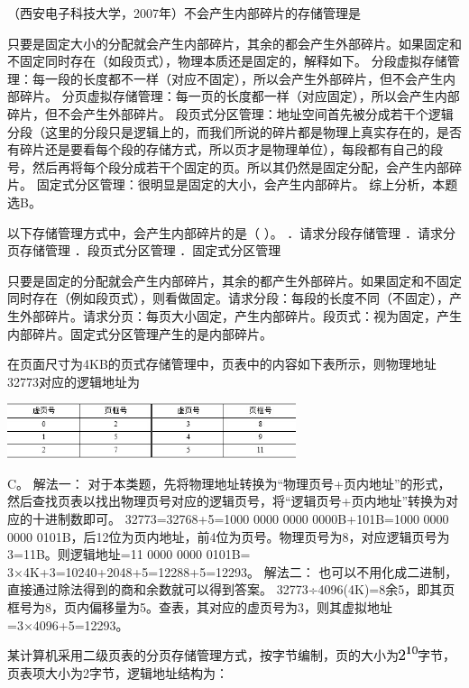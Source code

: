 \question （西安电子科技大学，2007年）不会产生内部碎片的存储管理是
\par{}
\begin{solution}只要是固定大小的分配就会产生内部碎片，其余的都会产生外部碎片。如果固定和不固定同时存在（如段页式），物理本质还是固定的，解释如下。
分段虚拟存储管理：每一段的长度都不一样（对应不固定），所以会产生外部碎片，但不会产生内部碎片。
分页虚拟存储管理：每一页的长度都一样（对应固定），所以会产生内部碎片，但不会产生外部碎片。
段页式分区管理：地址空间首先被分成若干个逻辑分段（这里的分段只是逻辑上的，而我们所说的碎片都是物理上真实存在的，是否有碎片还是要看每个段的存储方式，所以页才是物理单位），每段都有自己的段号，然后再将每个段分成若干个固定的页。所以其仍然是固定分配，会产生内部碎片。
固定式分区管理：很明显是固定的大小，会产生内部碎片。 综上分析，本题选B。
\end{solution}
\question 以下存储管理方式中，会产生内部碎片的是（ ）。 ．请求分段存储管理
．请求分页存储管理 ．段页式分区管理 ．固定式分区管理
\par{}
\begin{solution}只要是固定的分配就会产生内部碎片，其余的都产生外部碎片。如果固定和不固定同时存在（例如段页式），则看做固定。请求分段：每段的长度不同（不固定），产生外部碎片。请求分页：每页大小固定，产生内部碎片。段页式：视为固定，产生内部碎片。固定式分区管理产生的是内部碎片。
\end{solution}
\question 在页面尺寸为4KB的页式存储管理中，页表中的内容如下表所示，则物理地址32773对应的逻辑地址为

\includegraphics[width=3.33333in,height=0.63542in]{computerassets/b8801163b984bb0c1ef76b265a03fe84.jpeg}
\par{}
\begin{solution}C。 解法一：
对于本类题，先将物理地址转换为``物理页号+页内地址''的形式，然后查找页表以找出物理页号对应的逻辑页号，将``逻辑页号+页内地址''转换为对应的十进制数即可。
32773=32768+5=1000 0000 0000 0000B+101B=1000 0000 0000
0101B，后12位为页内地址，前4位为页号。物理页号为8，对应逻辑页号为3=11B。则逻辑地址=11
0000 0000 0101B= 3×4K+3=10240+2048+5=12288+5=12293。 解法二：
也可以不用化成二进制，直接通过除法得到的商和余数就可以得到答案。
32773÷4096(4K)=8余5，即其页框号为8，页内偏移量为5。查表，其对应的虚页号为3，则其虚拟地址=3×4096+5=12293。
\end{solution}
\question 某计算机采用二级页表的分页存储管理方式，按字节编制，页的大小为\includegraphics[width=0.21875in,height=0.15625in]{texmath/e0c3285Cdpi7B3507D25E7B107D}字节，页表项大小为2字节，逻辑地址结构为：

